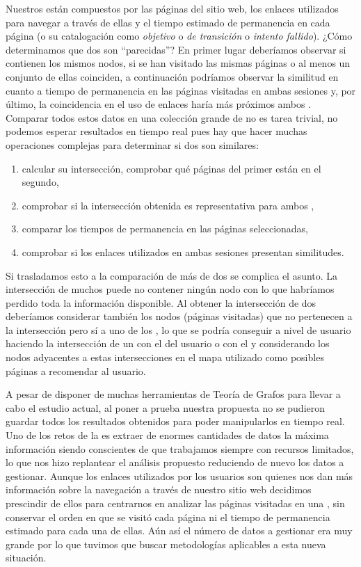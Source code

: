 Nuestros \grafos están compuestos por las páginas del sitio web, los enlaces utilizados para navegar a través de ellas y el tiempo estimado de permanencia en cada página (o su catalogación como \emph{objetivo} o \emph{de transición} o \emph{intento fallido}). ¿Cómo determinamos que dos \sns son "`parecidas"'? En primer lugar deberíamos observar si contienen los mismos nodos, si se han visitado las mismas páginas o al menos un conjunto de ellas coinciden, a continuación podríamos observar la similitud en cuanto a tiempo de permanencia en las páginas visitadas en ambas sesiones y, por último, la coincidencia en el uso de enlaces haría más próximos ambos \grafos. Comparar todos estos datos en una colección grande de \grafos no es tarea trivial, no podemos esperar resultados en tiempo real pues hay que hacer muchas operaciones complejas para determinar si dos \grafos son similares:
\begin{enumerate}
   \item calcular su intersección, comprobar qué páginas del primer \grafo están en el segundo,
   \item comprobar si la intersección obtenida es representativa para ambos \grafos,
   \item comparar los tiempos de permanencia en las páginas seleccionadas,
   \item comprobar si los enlaces utilizados en ambas sesiones presentan similitudes.
\end{enumerate}

Si trasladamos esto a la comparación de más de dos \grafos se complica el asunto. La intersección de muchos \grafos puede no contener ningún nodo con lo que habríamos perdido toda la información disponible. Al obtener la intersección de dos \grafos deberíamos considerar también los nodos (páginas visitadas) que no pertenecen a la intersección pero sí a uno de los \grafos, lo que se podría conseguir a nivel de usuario haciendo la intersección de un \grafo con el \mpnw del usuario o con el \musw y considerando los nodos adyacentes a estas intersecciones en el mapa utilizado como posibles páginas a recomendar al usuario.

A pesar de disponer de muchas herramientas de Teoría de Grafos para llevar a cabo el estudio actual, al poner a prueba nuestra propuesta no se pudieron guardar todos los resultados obtenidos para poder manipularlos en tiempo real. Uno de los retos de la \dm es extraer de enormes cantidades de datos la máxima información siendo conscientes de que trabajamos siempre con recursos limitados, lo que nos hizo replantear el análisis propuesto reduciendo de nuevo los datos a gestionar. Aunque los enlaces utilizados por los usuarios son quienes nos dan más información sobre la navegación a través de nuestro sitio web decidimos prescindir de ellos para centrarnos en analizar las páginas visitadas en una \sn, sin conservar el orden en que se visitó cada página ni el tiempo de permanencia estimado para cada una de ellas. Aún así el número de datos a gestionar era muy grande por lo que tuvimos que buscar metodologías aplicables a esta nueva situación.


